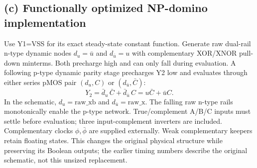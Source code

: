 \documentclass[10pt]{article}
\begin{document}
\subsection*{(c) Functionally optimized NP-domino implementation}
Use Y1=VSS for its exact steady-state constant function. Generate raw dual-rail n-type dynamic nodes $d_u=\bar u$ and $d_{\bar u}=u$ with complementary XOR/XNOR pull-down minterms. Both precharge high and can only fall during evaluation. A following p-type dynamic parity stage precharges Y2 low and evaluates through either series pMOS pair $(d_u,C)$ or $(d_{\bar u},\bar C)$:
\[Y_2=\bar d_u\,\bar C+\bar d_{\bar u}\,C=u\bar C+\bar uC.\]
In the schematic, $d_u=\mathrm{raw\_xb}$ and $d_{\bar u}=\mathrm{raw\_x}$. The falling raw n-type rails monotonically enable the p-type network. True/complement A/B/C inputs must settle before evaluation; three input-complement inverters are included. Complementary clocks $\phi,\bar\phi$ are supplied externally. Weak complementary keepers retain floating states. This changes the original physical structure while preserving its Boolean outputs; the earlier timing numbers describe the original schematic, not this unsized replacement.
\newpage
\providecommand{\auditmos}[4]{\begin{scope}[shift={(#1,#2)}]
\draw (0,.24)--(0,-.24);\draw (0,.20)--(.25,.20)--(.25,.5);
\draw (0,-.20)--(.25,-.20)--(.25,-.5);\draw (-.16,.23)--(-.16,-.23);
\ifnum#4=1\draw (-.26,0) circle (.06);\draw (-.75,0)--(-.32,0);
\else\draw (-.75,0)--(-.16,0);\fi
\node[anchor=east] at (-.76,0) {$#3$};\end{scope}}
\end{document}
